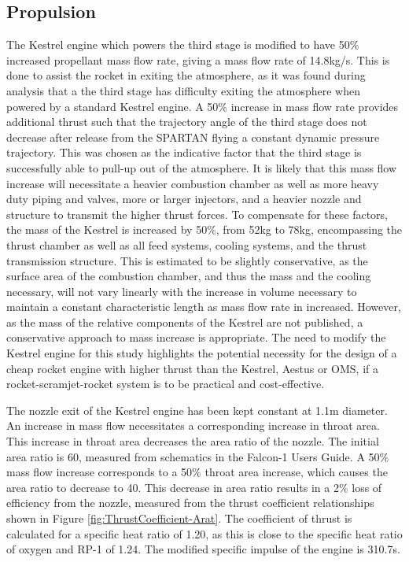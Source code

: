 		
		
		\subsection{Propulsion}
		
		
		The Kestrel engine which powers the third stage is modified to have 50\% increased propellant mass flow rate, giving a mass flow rate of 14.8kg/s. This is done to assist the rocket in exiting the atmosphere, as it was found during analysis that a the third stage has difficulty exiting the atmosphere when powered by a standard Kestrel engine. A 50\% increase in mass flow rate provides additional thrust such that the trajectory angle of the third stage does not decrease after release from the SPARTAN flying a constant dynamic pressure trajectory. This was chosen as the indicative factor that the third stage is successfully able to pull-up out of the atmosphere. It is likely that this mass flow increase will necessitate a heavier combustion chamber as well as more heavy duty piping and valves, more or larger injectors, and a heavier nozzle and structure to transmit the higher thrust forces\cite{RPE,Huzel1967}. To compensate for these factors, the mass of the Kestrel is increased by 50\%, from 52kg\cite{Wade2017} to 78kg, encompassing the thrust chamber as well as all feed systems, cooling systems, and the thrust transmission structure. This is estimated to be slightly conservative, as the surface area of the combustion chamber, and thus the mass and the cooling necessary, will not vary linearly with the increase in volume necessary to maintain a constant characteristic length as mass flow rate in increased\cite{RPE,Huzel1967}. However, as the mass of the relative components of the Kestrel are not published, a conservative approach to mass increase is appropriate. The need to modify the Kestrel engine for this study highlights the potential necessity for the design of a cheap rocket engine with higher thrust than the Kestrel, Aestus or OMS, if a rocket-scramjet-rocket system is to be practical and cost-effective.
		
		
		
		The nozzle exit of the Kestrel engine has been kept constant at 1.1m diameter. An increase in mass flow necessitates a corresponding increase in throat area. This increase in throat area decreases the area ratio of the nozzle. The initial area ratio is 60, measured from schematics in the Falcon-1 Users Guide. A 50\% mass flow increase corresponds to a 50\% throat area increase, which causes the area ratio to decrease to 40. This decrease in area ratio results in a 2\% loss of efficiency from the nozzle, measured from the thrust coefficient relationships shown in Figure \ref{fig:ThrustCoefficient-Arat}\cite{RPE}. The coefficient of thrust is calculated for a specific heat ratio of 1.20, as this is close to the specific heat ratio of oxygen and RP-1 of 1.24\cite{RPE}. The modified specific impulse of the engine is 310.7s. 
		
